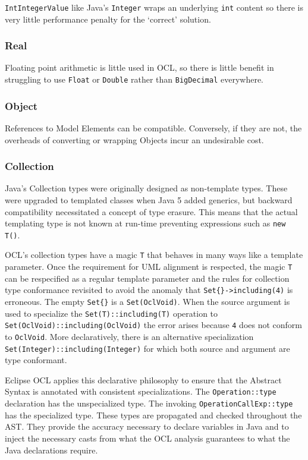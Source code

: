 \documentclass[sigconf]{acmart}
\begin{document}
\texttt{IntIntegerValue} like Java's \texttt{Integer} wraps an underlying \texttt{int} content so there is very little performance penalty for the `correct' solution.

\subsubsection{Real}

Floating point arithmetic is little used in OCL, so there is little benefit in struggling to use \verb|Float| or \verb|Double| rather than \verb|BigDecimal| everywhere.

\subsubsection{Object}

References to Model Elements can be compatible. Conversely, if they are not, the overheads of converting or wrapping Objects incur an undesirable cost.

\subsubsection{Collection}

Java's Collection types were originally designed as non-template types. These were upgraded to templated classes when Java 5 added generics, but backward compatibility necessitated a concept of type erasure. This means that the actual templating type is not known at run-time preventing expressions such as \verb|new T()|.

OCL's collection types have a magic \verb|T| that behaves in many ways like a template parameter. Once the requirement for UML alignment is respected, the magic \verb|T| can be respecified as a regular template parameter and the rules for collection type conformance revisited to avoid the anomaly that \verb|Set{}->including(4)| is erroneous. The empty \verb|Set{}| is a \verb|Set(OclVoid)|. When the source argument is used to specialize the \verb|Set(T)::including(T)| operation to \verb|Set(OclVoid)::including(OclVoid)| the error arises because \verb|4| does not conform to \verb|OclVoid|. More declaratively, there is an alternative specialization \verb|Set(Integer)::including(Integer)| for which both source and argument are type conformant.

Eclipse OCL applies this declarative philosophy to ensure that the Abstract Syntax is annotated with consistent specializations. The \verb|Operation::type| declaration has the unspecialized type. The invoking \verb|OperationCallExp::type| has the specialized type. 
These types are propagated and checked throughout the AST. They provide the accuracy necessary to declare variables in Java and to inject the necessary casts from what the OCL analysis guarantees to what the Java declarations require.
\end{document}
